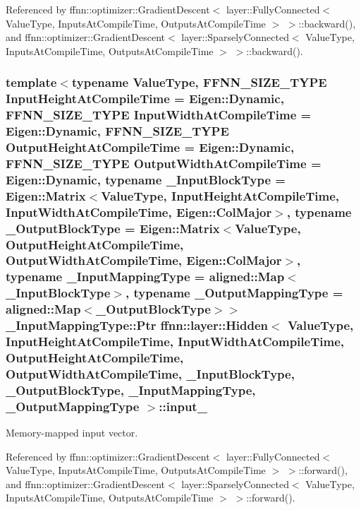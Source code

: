 Referenced by ffnn\-::optimizer\-::\-Gradient\-Descent$<$ layer\-::\-Fully\-Connected$<$ Value\-Type, Inputs\-At\-Compile\-Time, Outputs\-At\-Compile\-Time $>$ $>$\-::backward(), and ffnn\-::optimizer\-::\-Gradient\-Descent$<$ layer\-::\-Sparsely\-Connected$<$ Value\-Type, Inputs\-At\-Compile\-Time, Outputs\-At\-Compile\-Time $>$ $>$\-::backward().

\hypertarget{classffnn_1_1layer_1_1_hidden_a2583fadf189c4a9217ffe0146e8f2d1e}{
\subsubsection[{input\-\_\-}]{\setlength{\rightskip}{0pt plus 5cm}template$<$typename Value\-Type, F\-F\-N\-N\-\_\-\-S\-I\-Z\-E\-\_\-\-T\-Y\-P\-E Input\-Height\-At\-Compile\-Time = Eigen\-::\-Dynamic, F\-F\-N\-N\-\_\-\-S\-I\-Z\-E\-\_\-\-T\-Y\-P\-E Input\-Width\-At\-Compile\-Time = Eigen\-::\-Dynamic, F\-F\-N\-N\-\_\-\-S\-I\-Z\-E\-\_\-\-T\-Y\-P\-E Output\-Height\-At\-Compile\-Time = Eigen\-::\-Dynamic, F\-F\-N\-N\-\_\-\-S\-I\-Z\-E\-\_\-\-T\-Y\-P\-E Output\-Width\-At\-Compile\-Time = Eigen\-::\-Dynamic, typename \-\_\-\-Input\-Block\-Type = Eigen\-::\-Matrix$<$\-Value\-Type, Input\-Height\-At\-Compile\-Time, Input\-Width\-At\-Compile\-Time, Eigen\-::\-Col\-Major$>$, typename \-\_\-\-Output\-Block\-Type = Eigen\-::\-Matrix$<$\-Value\-Type, Output\-Height\-At\-Compile\-Time, Output\-Width\-At\-Compile\-Time, Eigen\-::\-Col\-Major$>$, typename \-\_\-\-Input\-Mapping\-Type = aligned\-::\-Map$<$\-\_\-\-Input\-Block\-Type$>$, typename \-\_\-\-Output\-Mapping\-Type = aligned\-::\-Map$<$\-\_\-\-Output\-Block\-Type$>$$>$ \-\_\-\-Input\-Mapping\-Type\-::\-Ptr {\bf ffnn\-::layer\-::\-Hidden}$<$ Value\-Type, Input\-Height\-At\-Compile\-Time, Input\-Width\-At\-Compile\-Time, Output\-Height\-At\-Compile\-Time, Output\-Width\-At\-Compile\-Time, \-\_\-\-Input\-Block\-Type, \-\_\-\-Output\-Block\-Type, \-\_\-\-Input\-Mapping\-Type, \-\_\-\-Output\-Mapping\-Type $>$\-::input\-\_\-\hspace{0.3cm}{\ttfamily [protected]}}}\label{classffnn_1_1layer_1_1_hidden_a2583fadf189c4a9217ffe0146e8f2d1e}


Memory-\/mapped input vector. 



Referenced by ffnn\-::optimizer\-::\-Gradient\-Descent$<$ layer\-::\-Fully\-Connected$<$ Value\-Type, Inputs\-At\-Compile\-Time, Outputs\-At\-Compile\-Time $>$ $>$\-::forward(), and ffnn\-::optimizer\-::\-Gradient\-Descent$<$ layer\-::\-Sparsely\-Connected$<$ Value\-Type, Inputs\-At\-Compile\-Time, Outputs\-At\-Compile\-Time $>$ $>$\-::forward().

